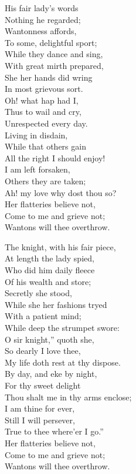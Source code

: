 \settowidth{\versewidth}{Thou shalt me in thy arms enclose;}
\begin{dcverse}
\begin{patverse}
His fair lady’s words\\
Nothing he regarded;\\
Wantonness affords,\\
To some, delightful sport;\\
While they dance and sing,\\
With great mirth prepared,\\
She her hands did wring\\
In most grievous sort.\\
Oh! what hap had I,\\
Thus to wail and cry,\\
Unrespected every day.\\
Living in disdain,\\
While that others gain\\
All the right I should enjoy!\\
I am left forsaken,\\
Others they are taken;\\
Ah! my love why dost thou so?\\
Her flatteries believe not,\\
Come to me and grieve not;\\
Wantons will thee overthrow.
\end{patverse}

\begin{patverse}
The knight, with his fair piece,\\
At length the lady spied,\\
Who did him daily fleece\\
Of his wealth and store;\\
Secretly she stood,\\
While she her fashions tryed\\
With a patient mind;\\
While deep the strumpet swore:\\
O sir knight,” quoth she,\\
So dearly I love thee,\\
My life doth rest at thy dispose.\\
By day, and eke by night,\\
For thy sweet delight\\
Thou shalt me in thy arms enclose;\\
I am thine for ever,\\
Still I will persever,\\
True to thee where’er I go.”\\
Her flatteries believe not,\\
Come to me and grieve not;\\
Wantons will thee overthrow.
\end{patverse}


\end{dcverse}
